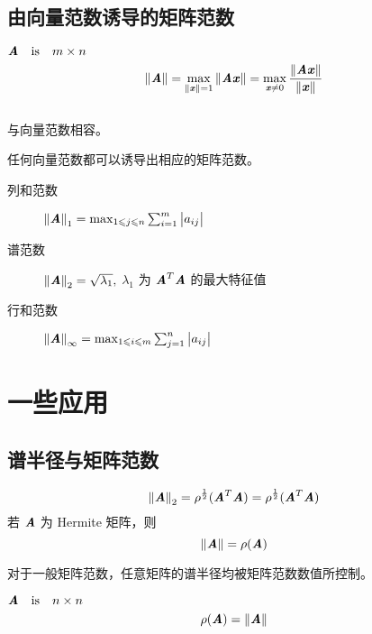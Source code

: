 \subsection{由向量范数诱导的矩阵范数}
\label{sub:由向量范数诱导的矩阵范数}

\begin{definition}[向量范数诱导的矩阵范数]
    $\amn$
    \[
        \norm{\MA} =
        \max_{\norm{\Vx}=1} \norm{\MA \Vx}
        = \max_{\Vx \neq 0} \frac{\norm{\MA\Vx}}{\norm{\Vx}}
    \]\\
    与向量范数相容。
\end{definition}

\begin{theorem}
    任何向量范数都可以诱导出相应的矩阵范数。
\end{theorem}

\begin{theorem}
    \begin{description}
        \item[列和范数] $\norm{\MA}_1 = \max_{1 \leqslant j \leqslant n} \sum_{i=1}^m \abs{a_{ij}}$
        \item[谱范数] $\norm{\MA}_2= \sqrt{\lambda_1},$ $\lambda_1$ 为 $\MA^T \MA$ 的最大特征值
        \item[行和范数] $\norm{\MA}_{\infty} = \max_{1 \leqslant i \leqslant m} \sum_{j=1}^n \abs{a_{ij}}$
    \end{description}
\end{theorem}

\section{一些应用}
\label{sec:一些应用}

\subsection{谱半径与矩阵范数}
\label{sub:谱半径与矩阵范数}

\begin{theorem}
    \[
        \norm{\MA}_2 = \rho^{\frac{1}{2}}(\MA^T \MA) = \rho^{\frac{1}{2}}(\MA^T \MA)
    \]
    若 $\MA$ 为 Hermite 矩阵，则
    \[
        \norm{\MA} = \rho(\MA)
    \]
\end{theorem}

对于一般矩阵范数，任意矩阵的谱半径均被矩阵范数数值所控制。

\begin{theorem}
    $\ann$
    \[
        \rho(\MA) = \norm{\MA}
    \]
\end{theorem}


